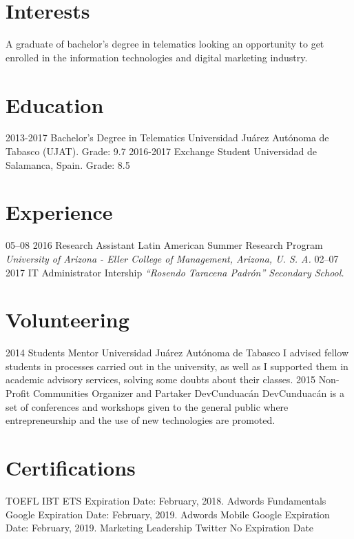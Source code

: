 \documentclass[]{friggeri-cv}
\begin{document}
\section{Interests}
A graduate of bachelor’s degree in telematics looking an opportunity to get enrolled in the
information technologies and digital marketing industry.
\section{Education}
\begin{entrylist}
  \entry
    {2013-2017}
    {Bachelor’s Degree in Telematics}
    {Universidad Ju\'{a}rez Aut\'{o}noma de Tabasco (UJAT).}
    {Grade: 9.7}
  \entry
    {2016-2017}
    {Exchange Student}
    {Universidad de Salamanca, Spain.}
    {Grade: 8.5}
\end{entrylist}
\section{Experience}
\begin{entrylist}
  \entry
    {05–08 2016}
    {Research Assistant}
    {Latin American Summer Research Program}
    {\emph{University of Arizona - Eller College of Management, Arizona, U. S. A.}}
  \entry
    {02–07 2017}
    {IT Administrator}
    {Intership}
    {\emph{“Rosendo Taracena Padr\'{o}n” Secondary School.}}
\end{entrylist}
\section{Volunteering}
\begin{entrylist}
  \entry
    {2014}
    {Students Mentor}
    {Universidad Ju\'{a}rez Aut\'{o}noma de Tabasco}
    {I advised fellow students in processes carried out in the university, as well as I supported them in academic advisory services, solving some doubts about their classes.}
  \entry
    {2015}
    {Non-Profit Communities Organizer and Partaker}
    {DevCunduac\'{a}n}
    {DevCunduac\'{a}n is a set of conferences and workshops given to the general public where entrepreneurship and the use of new technologies are promoted.}
\end{entrylist}
\section{Certifications}
\begin{entrylist}
          {TOEFL IBT}
          {ETS}
          {Expiration Date: February, 2018.}
          {Adwords Fundamentals}
          {Google}
          {Expiration Date: February, 2019.}
          {Adwords Mobile}
          {Google}
          {Expiration Date: February, 2019.}
          {Marketing Leadership}
          {Twitter}
          {No Expiration Date}
\end{entrylist}
\newline
\newline
\newline
\newline
\newline
\end{document}
